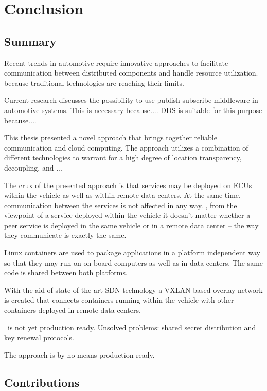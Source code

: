 
\chapter{Conclusion}\label{chapter:conclusion}

\section{Summary}

Recent trends in automotive require innovative approaches to facilitate communication between distributed components and handle resource utilization. because traditional technologies are reaching their limits. 

Current research discusses the possibility to use publish-subscribe middleware in automotive systems. This is necessary because.... DDS is suitable for this purpose because.... 

This thesis presented a novel approach that brings together reliable communication and cloud computing. The approach utilizes a combination of different technologies to warrant for a high degree of location transparency, decoupling,  and ...

The crux of the presented approach is that services may be deployed on ECUs within the vehicle as well as within remote data centers. At the same time, communication between the services is not affected in any way. \Ie , from the viewpoint of a service deployed within the vehicle it doesn't matter whether a peer service is deployed in the same vehicle or in a remote data center -- the way they communicate is exactly the same.


Linux containers are used to package applications in a platform independent way so that they may run on on-board computers as well as in data centers. The same code is shared between both platforms.

With the aid of state-of-the-art SDN technology a VXLAN-based overlay network is created that connects containers running within the vehicle with other containers deployed in remote data centers. 


\wnet\ is not yet production ready. Unsolved problems: shared secret distribution and key renewal protocols.

The approach is by no means production ready.

\section{Contributions}

